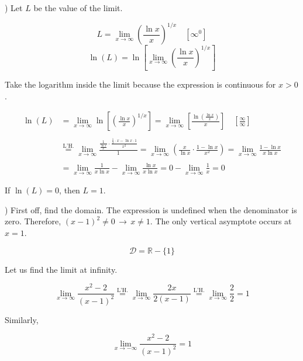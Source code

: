 \documentclass{article}
\begin{document}
\hfill

) Let $L$ be the value of the limit.

\[L =\lim_{x\to \infty} \left(\frac{\ln x}x\right)^{1/x}\quad \left[\infty^0\right]\]
\[\ln(L) =\ln\left[\lim_{x\to \infty} \left(\frac{\ln x}x\right)^{1/x}\right]\]

\hfill

\noindent Take the logarithm inside the limit because the expression is continuous for $x>0$.

\begin{align*}\ln(L)&=\lim_{x\to \infty} \ln\left[\left(\frac{\ln x}x\right)^{1/x}\right]=\lim_{x\to \infty} \left[\frac{\ln\left(\frac{\ln x}x\right)}x\right]\quad\left[\frac\infty\infty\right]\\\\&\overset{\text{L'H.}}{=}\lim_{x\to\infty} \frac{\frac1{\frac{\ln x}{x}}\cdot\frac{\frac1x\cdot x -\ln x\cdot 1}{x^2}}{1}=\lim_{x\to\infty}\left({\frac x{\ln x}\cdot\frac{1-\ln x}{x^2}}\right)=\lim_{x\to\infty}\frac{1-\ln x}{x\ln x}\\\\&=\lim_{x\to\infty}\frac1{x\ln x} - \lim_{x\to\infty}\frac{\ln x}{x\ln x}=0-\lim_{x\to\infty}\frac1x=0\end{align*}

\hfill

\noindent If $\ln(L) = 0$, then $\boxed{L = 1}$.

\hfill

) First off, find the domain. The expression is undefined when the denominator is zero. Therefore, $(x-1)^2\neq0\,\rightarrow\,x\neq1$. The only vertical asymptote occurs at $x = 1$.

\begin{equation*}\mathcal{D} = \mathbb{R} - \{1\}\end{equation*}

\hfill

\noindent Let us find the limit at infinity.

\begin{equation*}\lim_{x\to \infty}\frac{x^2-2}{(x-1)^2} \overset{\text{L'H.}}{=} \lim_{x\to \infty} \frac{2x}{2(x-1)} \overset{\text{L'H.}}{=} \lim_{x\to \infty} \frac{2}{2}=1\end{equation*}

\noindent Similarly,

\begin{equation*}\lim_{x\to -\infty}\frac{x^2-2}{(x-1)^2}=1\end{equation*}
\end{document}

